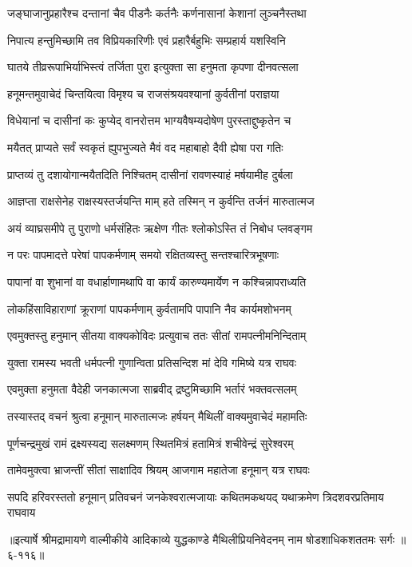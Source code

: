 \twolineshloka
{जङ्घाजानुप्रहारैश्च दन्तानां चैव पीडनैः}
{कर्तनैः कर्णनासानां केशानां लुञ्चनैस्तथा} %

\twolineshloka
{निपात्य हन्तुमिच्छामि तव विप्रियकारिणीः}
{एवं प्रहारैर्बहुभिः सम्प्रहार्य यशस्विनि} %

\twolineshloka
{घातये तीव्ररूपाभिर्याभिस्त्वं तर्जिता पुरा}
{इत्युक्ता सा हनुमता कृपणा दीनवत्सला} %

\twolineshloka
{हनूमन्तमुवाचेदं चिन्तयित्वा विमृश्य च}
{राजसंश्रयवश्यानां कुर्वतीनां पराज्ञया} %

\twolineshloka
{विधेयानां च दासीनां कः कुप्येद् वानरोत्तम}
{भाग्यवैषम्यदोषेण पुरस्ताद्दुष्कृतेन च} %

\twolineshloka
{मयैतत् प्राप्यते सर्वं स्वकृतं ह्युपभुज्यते}
{मैवं वद महाबाहो दैवी ह्येषा परा गतिः} %

\twolineshloka
{प्राप्तव्यं तु दशायोगान्मयैतदिति निश्चितम्}
{दासीनां रावणस्याहं मर्षयामीह दुर्बला} %

\twolineshloka
{आज्ञप्ता राक्षसेनेह राक्षस्यस्तर्जयन्ति माम्}
{हते तस्मिन् न कुर्वन्ति तर्जनं मारुतात्मज} %

\twolineshloka
{अयं व्याघ्रसमीपे तु पुराणो धर्मसंहितः}
{ऋक्षेण गीतः श्लोकोऽस्ति तं निबोध प्लवङ्गम} %

\twolineshloka
{न परः पापमादत्ते परेषां पापकर्मणाम्}
{समयो रक्षितव्यस्तु सन्तश्चारित्रभूषणाः} %

\twolineshloka
{पापानां वा शुभानां वा वधार्हाणामथापि वा}
{कार्यं कारुण्यमार्येण न कश्चिन्नापराध्यति} %

\twolineshloka
{लोकहिंसाविहाराणां क्रूराणां पापकर्मणाम्}
{कुर्वतामपि पापानि नैव कार्यमशोभनम्} %

\twolineshloka
{एवमुक्तस्तु हनुमान् सीतया वाक्यकोविदः}
{प्रत्युवाच ततः सीतां रामपत्नीमनिन्दिताम्} %

\twolineshloka
{युक्ता रामस्य भवती धर्मपत्नी गुणान्विता}
{प्रतिसन्दिश मां देवि गमिष्ये यत्र राघवः} %

\twolineshloka
{एवमुक्ता हनुमता वैदेही जनकात्मजा}
{साब्रवीद् द्रष्टुमिच्छामि भर्तारं भक्तवत्सलम्} %

\twolineshloka
{तस्यास्तद् वचनं श्रुत्वा हनूमान् मारुतात्मजः}
{हर्षयन् मैथिलीं वाक्यमुवाचेदं महामतिः} %

\twolineshloka
{पूर्णचन्द्रमुखं रामं द्रक्ष्यस्यद्य सलक्ष्मणम्}
{स्थितमित्रं हतामित्रं शचीवेन्द्रं सुरेश्वरम्} %

\twolineshloka
{तामेवमुक्त्वा भ्राजन्तीं सीतां साक्षादिव श्रियम्}
{आजगाम महातेजा हनूमान् यत्र राघवः} %

\twolineshloka
{सपदि हरिवरस्ततो हनूमान् प्रतिवचनं जनकेश्वरात्मजायाः}
{कथितमकथयद् यथाक्रमेण त्रिदशवरप्रतिमाय राघवाय} %


॥इत्यार्षे श्रीमद्रामायणे वाल्मीकीये आदिकाव्ये युद्धकाण्डे मैथिलीप्रियनिवेदनम् नाम षोडशाधिकशततमः सर्गः ॥६-११६॥
